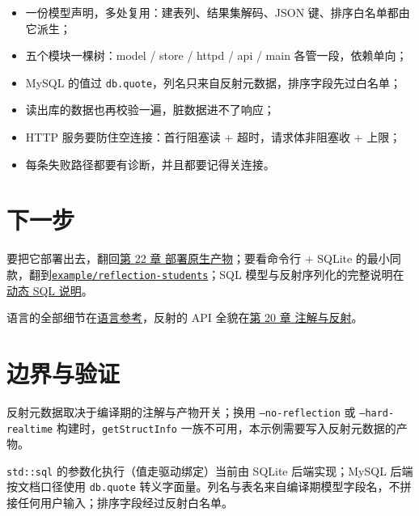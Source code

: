 \begin{itemize}

\item 一份模型声明，多处复用：建表列、结果集解码、JSON 键、排序白名单都由它派生；

\item 五个模块一棵树：model / store / httpd / api / main 各管一段，依赖单向；

\item MySQL 的值过 \texttt{db.\allowbreak{}quote}，列名只来自反射元数据，排序字段先过白名单；

\item 读出库的数据也再校验一遍，脏数据进不了响应；

\item HTTP 服务要防住空连接：首行阻塞读 + 超时，请求体非阻塞收 + 上限；

\item 每条失败路径都要有诊断，并且都要记得关连接。

\end{itemize}

\section{下一步}

要把它部署出去，翻回\hyperref[ch:22]{第 22 章 部署原生产物}；要看命令行 + SQLite 的最小同款，翻到\href{https://github.com/rabbitc999/ChaLi/blob/master/example/reflection-students/README.md}{\texttt{example/\allowbreak{}reflection-students}}；SQL 模型与反射序列化的完整说明在\href{https://github.com/rabbitc999/ChaLi/blob/master/doc/33-reflection-serialization-sql.md}{动态 SQL 说明}。

语言的全部细节在\href{https://github.com/rabbitc999/ChaLi/blob/master/doc/04-language-reference.md}{语言参考}，反射的 API 全貌在\hyperref[ch:20]{第 20 章 注解与反射}。

\section{边界与验证}

反射元数据取决于编译期的注解与产物开关；换用 \texttt{--no-reflection} 或 \texttt{--hard-realtime} 构建时，\texttt{get\allowbreak{}Struct\allowbreak{}Info} 一族不可用，本示例需要写入反射元数据的产物。

\texttt{std:\allowbreak{}:\allowbreak{}sql} 的参数化执行（值走驱动绑定）当前由 SQLite 后端实现；MySQL 后端按文档口径使用 \texttt{db.\allowbreak{}quote} 转义字面量。列名与表名来自编译期模型字段名，不拼接任何用户输入；排序字段经过反射白名单。

